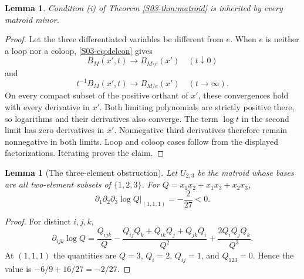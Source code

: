 \documentclass[11pt,a4paper]{article}
\newtheorem{lemma}[theorem]{Lemma}
\theoremstyle{definition}\newtheorem{definition}[theorem]{Definition}
\theoremstyle{remark}\newtheorem{remark}[theorem]{Remark}
\numberwithin{equation}{section}
\begin{document}
\begin{lemma}\label{S03-lem:minor}
Condition (i) of Theorem \ref{S03-thm:matroid} is inherited by every matroid minor.
\end{lemma}
\begin{proof}
Let the three differentiated variables be different from $e$. When $e$ is neither a loop nor a coloop, \eqref{S03-eq:delcon} gives
\[
 B_M(x',t)\longrightarrow B_{M\setminus e}(x')\quad(t\downarrow0)
\]
and
\[
 t^{-1}B_M(x',t)\longrightarrow B_{M/e}(x')\quad(t\to\infty).
\]
On every compact subset of the positive orthant of $x'$, these convergences hold with every derivative in $x'$. Both limiting polynomials are strictly positive there, so logarithms and their derivatives also converge. The term $\log t$ in the second limit has zero derivatives in $x'$. Nonnegative third derivatives therefore remain nonnegative in both limits. Loop and coloop cases follow from the displayed factorizations. Iterating proves the claim.
\end{proof}

\begin{lemma}[The three-element obstruction]\label{S03-lem:obstruction}
Let $U_{2,3}$ be the matroid whose bases are all two-element subsets of $\{1,2,3\}$. For $Q=x_1x_2+x_1x_3+x_2x_3$,
\[
 \partial_1\partial_2\partial_3\log Q\big|_{(1,1,1)}=-\frac{2}{27}<0.
\]
\end{lemma}
\begin{proof}
For distinct $i,j,k$,
\[
 \partial_{ijk}\log Q
 =\frac{Q_{ijk}}{Q}
 -\frac{Q_{ij}Q_k+Q_{ik}Q_j+Q_{jk}Q_i}{Q^2}
 +\frac{2Q_iQ_jQ_k}{Q^3}.
\]
At $(1,1,1)$ the quantities are $Q=3$, $Q_i=2$, $Q_{ij}=1$, and $Q_{123}=0$. Hence the value is $-6/9+16/27=-2/27$.
\end{proof}
\end{document}
